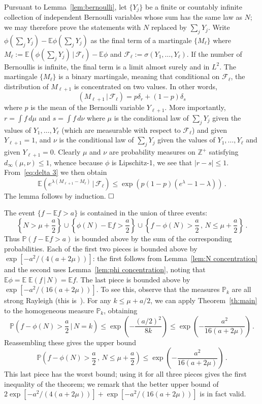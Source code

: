\documentclass[10pt]{article}
\theoremstyle{plain}
\theoremstyle{remark}
\def\Cox{\qed}
\def\Z{\mathbb{Z}}
\def\E{{\mathbb E}}
\def\P{{\mathbb P}}
\def\Cox{\hfill \Box}
\def\|{{\, | \, }}
\def\F{{\mathcal F}}
\def\mean{\mu}
\begin{document}
  Pursuant to Lemma~\ref{lem:bernoulli},
let $\{ Y_j \}$ be a finite or countably infinite collection of
independent Bernoulli variables whose sum has the same law as $N$;
we may therefore prove the statements with $N$ replaced by
$\sum_j Y_j$.  Write $\phi (\sum_j Y_j) - \E \phi (\sum_j Y_j)$
as the final term of a martingale $\{ M_\ell \}$ where
$M_\ell := \E ( \phi (\sum_j Y_j) \| \F_\ell) - \E \phi$ and
$\F_\ell := \sigma (Y_1 , \ldots , Y_\ell)$.  If the number
of Bernoullis is infinite, the final term is a limit
almost surely and in $L^2$.  The martingale $\{ M_\ell \}$
is a binary martingale, meaning that conditional on
$\F_\ell$, the distribution of $M_{\ell+1}$ is concentrated on
two values.  In other words,
$$(M_{\ell+1} \| \F_\ell) = p \delta_r + (1-p) \delta_s$$
where $p$ is the mean of the Bernoulli variable $Y_{\ell+1}$.
More importantly, $r = \int f \, d\mu$ and $s = \int f \, d\nu$
where $\mu$ is the conditional law of $\sum_j Y_j$ given
the values of $Y_1 , \ldots , Y_\ell$ (which are measurable
with respect to $\F_\ell$) and given $Y_{\ell + 1} = 1$,
and $\nu$ is the conditional law of $\sum_j Y_j$ given
the values of $Y_1 , \ldots , Y_\ell$ and given $Y_{\ell + 1} = 0$.
Clearly $\mu$ and $\nu$ are probability measures on $\Z^+$
satisfying $d_\infty (\mu , \nu) \leq 1$, whence because $\phi$
is Lipschitz-1, we see that $|r-s| \leq 1$.  From~\eqref{eq:delta 3}
we then obtain
$$\E \left ( e^{\lambda (M_{\ell+1} - M_\ell)} \| \F_\ell \right )
   \leq \exp \left ( p (1-p) (e^\lambda - 1 - \lambda) \right ) \, .$$
The lemma follows by induction.
$\Cox$

The event $\{ f - \E f > a \}$ is contained in the union of three events:
$$\left \{ N > \mean + \frac{a}{2} \right \} \cup
   \left \{ \phi (N) - \E f > \frac{a}{2} \right \} \cup
   \left \{ f - \phi (N) > \frac{a}{2} \, , \, N \leq \mean +
      \frac{a}{2} \right \}  \, .$$
Thus $\P (f - \E f > a)$ is bounded above by the sum of the
corresponding probabilities.  Each of the first two pieces is
bounded above by $\exp [- a^2 / (4(a + 2\mean))]$: the first
follows from Lemma~\ref{lem:N concentration} and the second
uses Lemma~\ref{lem:phi concentration}, noting that $\E \phi
= \E \; \E (f \| N) = \E f$.  The last piece is bounded above
by $\exp [- a^2 / (16 (a + 2\mean))]$.  To see this, observe
that the measures $\P_k$ are all strong Rayleigh (this
is~\cite[Corollary~4.18]{borcea-branden-liggett}).
For any $k \leq \mean + a/2$, we can apply Theorem~\ref{th:main} to the
homogeneous measure $\P_k$, obtaining
$$\P \left ( f - \phi (N) > \frac{a}{2} \| N = k \right )
   \leq \exp \left ( - \frac{(a/2)^2}{8 k} \right )
   \leq \exp \left ( - \frac{a^2}{16 (a + 2 \mean)} \right ) \, .$$
Reassembling these gives the upper bound
$$\P \left ( f - \phi (N) > \frac{a}{2} \, , \, N \leq \mean +
   \frac{a}{2} \right )
   \leq \exp \left ( -\frac{a^2}{16 (a + 2 \mean)} \right ) \, .$$
This last piece has the worst bound; using it for all three
pieces gives the first inequality of the theorem; we remark that
the better upper bound of $2 \exp [- a^2 / (4(a + 2\mean))] +
\exp [- a^2 / (16 (a + 2\mean))]$ is in fact valid.
\end{document}
